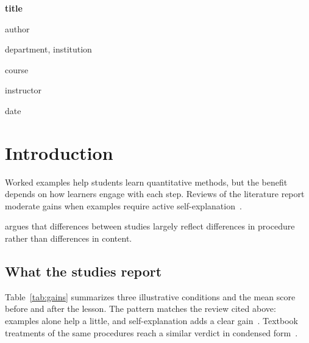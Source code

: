 \documentclass[a4paper,12pt]{article}
\begin{document}
  \begin{center}
    \vspace*{2cm}
    \textbf{{{title}}}
    \vspace{\baselineskip}

    {{author}}

    \vspace{\baselineskip}
    {{department}}, {{institution}}

    {{course}}

    {{instructor}}

    {{date}}
  \end{center}
  \newpage


  \section{Introduction}
  Worked examples help students learn quantitative methods, but the benefit
  depends on how learners engage with each step. Reviews of the literature
  report moderate gains when examples require active
  self-explanation~\cite{example}.

   argues that differences between studies largely reflect
  differences in procedure rather than differences in content.

  \subsection{What the studies report}
  Table~\ref{tab:gains} summarizes three illustrative conditions and the
  mean score before and after the lesson. The pattern matches the review
  cited above: examples alone help a little, and self-explanation adds a
  clear gain~\cite{example}. Textbook treatments of the same procedures
  reach a similar verdict in condensed form~\cite{example2}.
\end{document}
